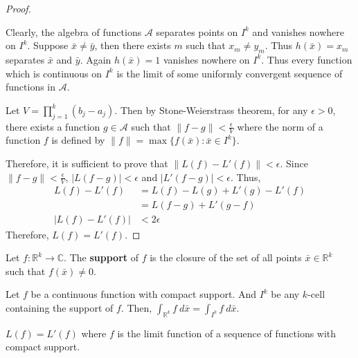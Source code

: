 \begin{proof}
\begin{commentary}
	Clearly, the algebra of functions $\mathscr{A}$ separates points on $I^k$ and vanishes nowhere on $I^k$.
	Suppose $\bar{x} \ne \bar{y}$, then there exists $m$ such that $x_m \ne y_m$.
	Thus $h(\bar{x}) = x_m$ separates $\bar{x}$ and $\bar{y}$.
	Again $h(\bar{x}) = 1$ vanishes nowhere on $I^k$.
	Thus every function which is continuous on $I^k$ is the limit of some uniformly convergent sequence of functions in $\mathscr{A}$.
\end{commentary}
	
Let $V = \prod_{j = 1}^k (b_j - a_j)$.
Then by Stone-Weierstrass theorem,
for any $\epsilon > 0$,	there exists a function $g \in \mathscr{A}$
such that $\|f-g\| < \frac{\epsilon}{V}$
where the norm of a function $f$ is defined by
$\|f\| = \max\{f(\bar{x}) : \bar{x} \in I^k\}$.

Therefore, it is sufficient to prove that $\|L(f)-L'(f)\| < \epsilon$.
Since $\|f-g\| < \frac{\epsilon}{V}$, $|L(f-g)| < \epsilon$ and $|L'(f-g)| < \epsilon$. Thus,
\begin{align*}
	L(f)-L'(f) & = L(f) - L(g) + L'(g) - L'(f) \\
	& = L(f-g) + L'(g-f)\\
	|L(f)-L'(f)| & < 2\epsilon
\end{align*}
Therefore, $L(f) = L'(f)$.
\end{proof}

\begin{definition}
	Let $f : \mathbb{R}^k \to \mathbb{C}$.
	The \textbf{support} of $f$ is the closure of the set of all points $\bar{x} \in \mathbb{R}^k$ such that $f(\bar{x}) \ne 0$.
\end{definition}

\begin{remark}
	Let $f$ be a continuous function with compact support.
	And $I^k$ be any $k$-cell containing the support of $f$.
	Then, $\int_{\mathbb{R}^k} f\ d\bar{x} = \int_{I^k} f\ d\bar{x}$.
\end{remark}

\begin{commentary}
	$L(f) = L'(f)$ where $f$ is the limit function of a sequence of functions with compact support.
	\cite[\S10.4 Example]{apostol}
\end{commentary}

